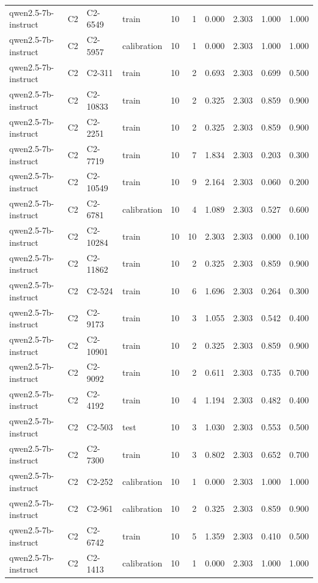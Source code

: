 \begin{table}
\begin{tabular}{llllrrrrrr}
qwen2.5-7b-instruct & C2 & C2-6549 & train & 10 & 1 & 0.000 & 2.303 & 1.000 & 1.000 \\
qwen2.5-7b-instruct & C2 & C2-5957 & calibration & 10 & 1 & 0.000 & 2.303 & 1.000 & 1.000 \\
qwen2.5-7b-instruct & C2 & C2-311 & train & 10 & 2 & 0.693 & 2.303 & 0.699 & 0.500 \\
qwen2.5-7b-instruct & C2 & C2-10833 & train & 10 & 2 & 0.325 & 2.303 & 0.859 & 0.900 \\
qwen2.5-7b-instruct & C2 & C2-2251 & train & 10 & 2 & 0.325 & 2.303 & 0.859 & 0.900 \\
qwen2.5-7b-instruct & C2 & C2-7719 & train & 10 & 7 & 1.834 & 2.303 & 0.203 & 0.300 \\
qwen2.5-7b-instruct & C2 & C2-10549 & train & 10 & 9 & 2.164 & 2.303 & 0.060 & 0.200 \\
qwen2.5-7b-instruct & C2 & C2-6781 & calibration & 10 & 4 & 1.089 & 2.303 & 0.527 & 0.600 \\
qwen2.5-7b-instruct & C2 & C2-10284 & train & 10 & 10 & 2.303 & 2.303 & 0.000 & 0.100 \\
qwen2.5-7b-instruct & C2 & C2-11862 & train & 10 & 2 & 0.325 & 2.303 & 0.859 & 0.900 \\
qwen2.5-7b-instruct & C2 & C2-524 & train & 10 & 6 & 1.696 & 2.303 & 0.264 & 0.300 \\
qwen2.5-7b-instruct & C2 & C2-9173 & train & 10 & 3 & 1.055 & 2.303 & 0.542 & 0.400 \\
qwen2.5-7b-instruct & C2 & C2-10901 & train & 10 & 2 & 0.325 & 2.303 & 0.859 & 0.900 \\
qwen2.5-7b-instruct & C2 & C2-9092 & train & 10 & 2 & 0.611 & 2.303 & 0.735 & 0.700 \\
qwen2.5-7b-instruct & C2 & C2-4192 & train & 10 & 4 & 1.194 & 2.303 & 0.482 & 0.400 \\
qwen2.5-7b-instruct & C2 & C2-503 & test & 10 & 3 & 1.030 & 2.303 & 0.553 & 0.500 \\
qwen2.5-7b-instruct & C2 & C2-7300 & train & 10 & 3 & 0.802 & 2.303 & 0.652 & 0.700 \\
qwen2.5-7b-instruct & C2 & C2-252 & calibration & 10 & 1 & 0.000 & 2.303 & 1.000 & 1.000 \\
qwen2.5-7b-instruct & C2 & C2-961 & calibration & 10 & 2 & 0.325 & 2.303 & 0.859 & 0.900 \\
qwen2.5-7b-instruct & C2 & C2-6742 & train & 10 & 5 & 1.359 & 2.303 & 0.410 & 0.500 \\
qwen2.5-7b-instruct & C2 & C2-1413 & calibration & 10 & 1 & 0.000 & 2.303 & 1.000 & 1.000 \\

\end{tabular}
\end{table}
